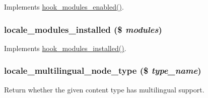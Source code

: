 Implements \hyperlink{group__hooks_ga0eb7c67333e0f40b4a46c0dc4c4a92f3}{hook\_\-modules\_\-enabled()}. \hypertarget{locale_8module_af50fdbbf6404279f355b1c8e8f215e18}{
\subsubsection[{locale\_\-modules\_\-installed}]{\setlength{\rightskip}{0pt plus 5cm}locale\_\-modules\_\-installed (\$ {\em modules})}}
\label{locale_8module_af50fdbbf6404279f355b1c8e8f215e18}
Implements \hyperlink{group__hooks_ga71b7268520567cac1a2f296c205e5227}{hook\_\-modules\_\-installed()}. \hypertarget{locale_8module_a8acca52e1b0e4bcb4de55edee89e3922}{
\subsubsection[{locale\_\-multilingual\_\-node\_\-type}]{\setlength{\rightskip}{0pt plus 5cm}locale\_\-multilingual\_\-node\_\-type (\$ {\em type\_\-name})}}
\label{locale_8module_a8acca52e1b0e4bcb4de55edee89e3922}
Return whether the given content type has multilingual support.

